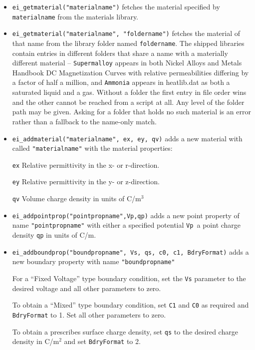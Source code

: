 \begin{itemize}
\item \texttt{ei\_getmaterial("materialname")} fetches the material specified by \texttt{materialname}
from the materials library.

\item \texttt{ei\_getmaterial("materialname", "foldername")} fetches the
material of that name from the library folder named \texttt{foldername}.
The shipped libraries contain entries in different folders that share a
name with a materially different material -- \texttt{Supermalloy} appears
in both Nickel Alloys and Metals Handbook DC Magnetization Curves with
relative permeabilities differing by a factor of half a million, and
\texttt{Ammonia} appears in heatlib.dat as both a saturated liquid and a
gas. Without a folder the first entry in file order wins and the other
cannot be reached from a script at all. Any level of the folder path may
be given. Asking for a folder that holds no such material is an error
rather than a fallback to the name-only match.

\item \texttt{ei\_addmaterial("materialname", ex, ey, qv)} adds a new material with
called \texttt{"materialname"} with the material properties:

\texttt{ex} Relative permittivity in the x- or r-direction.

\texttt{ey} Relative permittivity in the y- or z-direction.

\texttt{qv} Volume charge density in units of C/m$^{3}$

\item \texttt{ei\_addpointprop("pointpropname",Vp,qp)} adds a new point property of
name \texttt{"pointpropname"} with either a specified potential
\texttt{Vp }a point charge density \texttt{qp} in units of C/m.

\item \texttt{ei\_addboundprop("boundpropname", Vs, qs, c0, c1, BdryFormat)} adds a
new boundary property with name \texttt{"boundpropname"}

For a ``Fixed Voltage'' type boundary condition, set the
\texttt{Vs} parameter to the desired voltage and all other
parameters to zero.

To obtain a ``Mixed'' type boundary condition, set \texttt{C1} and
\texttt{C0} as required and \texttt{BdryFormat} to 1. Set all other
parameters to zero.

To obtain a prescribes surface charge density, set \texttt{qs} to
the desired charge density in C/m$^{2}$ and set \texttt{BdryFormat}
to 2.


\end{itemize}
